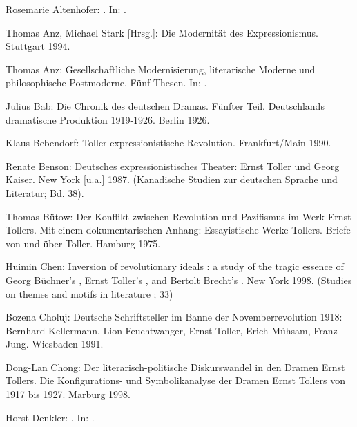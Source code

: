 
\begin{BibList}{}

  Rosemarie Altenhofer: 
  \Cite{Masse Mensch}.
  In: .

  Thomas Anz, Michael Stark [Hrsg.]:
  Die Modernität des Expressionismus. 
  Stuttgart 1994.

  Thomas Anz: 
  Gesellschaftliche Modernisierung, literarische Moderne und philosophische
  Postmoderne. Fünf Thesen. 
  In: .

  Julius Bab:
  Die Chronik des deutschen Dramas. Fünfter Teil. Deutschlands dramatische
  Produktion 1919-1926.
  Berlin 1926.

  Klaus Bebendorf:
  Toller expressionistische Revolution. 
  Frankfurt/Main 1990.

  Renate Benson:
  Deutsches expressionistisches Theater: Ernst Toller und Georg Kaiser.
  New York [u.a.] 1987. (Kanadische Studien zur deutschen
  Sprache und Literatur; Bd. 38).

  Thomas Bütow:
  Der Konflikt zwischen Revolution und Pazifismus im Werk Ernst Tollers.
  Mit einem dokumentarischen Anhang: Essayistische Werke Tollers.
  Briefe von und über Toller. 
  Hamburg 1975.

  Huimin Chen:
  Inversion of revolutionary ideals : a study of the tragic
  essence of Georg Büchner's \Cite{Dantons Tod}, Ernst
  Toller's \Cite{Masse Mensch}, and Bertolt Brecht's 
  \Cite{Die Massnahme}.
  New York 1998. (Studies on themes and motifs in
  literature ; 33)

  Bozena Choluj:
  Deutsche Schriftsteller im Banne der Novemberrevolution 1918:
  Bernhard Kellermann, Lion Feuchtwanger, Ernst Toller, Erich
  Mühsam, Franz Jung.
  Wiesbaden 1991.

  Dong-Lan Chong:
  Der literarisch-politische Diskurswandel in den Dramen Ernst
  Tollers. Die Konfigurations- und Symbolikanalyse der Dramen Ernst Tollers
  von 1917 bis 1927.
  Marburg 1998.

  Horst Denkler:
  \Cite{Die Wandlung}. 
  In: \cite{HERMAN.81}.


\end{BibList}
